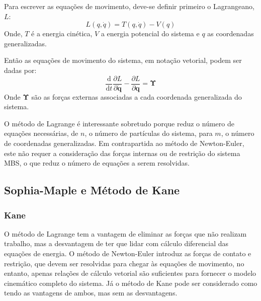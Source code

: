 Para escrever as equações de movimento, deve-se definir primeiro o
Lagrangeano, $L$:
%
\begin{equation}
	L(q, \dot{q}) = T(q, \dot{q}) - V(q)
\end{equation}
%
Onde, $T$ é a energia cinética, $V$ a energia potencial do sistema e
$q$ as coordenadas generalizadas.

Então as equações de movimento do sistema, em notação vetorial, podem ser dadas
por:
%
\begin{equation}
	\frac{\mathrm{d} }{\mathrm{d} t}\frac{\partial L}{\partial \mathbf{\dot{q}}} -
	\frac{\partial L}{\partial \mathbf{q}} = \boldsymbol{\Upsilon}
\end{equation}
%
Onde $\boldsymbol{\Upsilon}$ são as forças externas associadas a cada
coordenada generalizada do sistema.

O método de Lagrange é interessante sobretudo porque reduz o número de equações
necessárias, de $n$, o número de partículas do sistema, para $m$, o número de
coordenadas generalizadas. Em contrapartida ao método de Newton-Euler, este
não requer a consideração das forças internas ou de restrição do sistema MBS, o
que reduz o número de equações a serem resolvidas.




\subsection{Sophia-Maple e Método de Kane}\label{sec::sophia_kane}

\subsubsection{Kane}

O método de Lagrange tem a vantagem de eliminar as forças que não realizam
trabalho, mas a desvantagem de ter que lidar com cálculo diferencial das
equações de energia. O método de Newton-Euler introduz as forças de contato e
restrição, que devem ser resolvidas para chegar às equações de movimento, no
entanto, apenas relações de cálculo vetorial são suficientes para fornecer o
modelo cinemático completo do sistema. Já o método de Kane pode ser
considerado como tendo as vantagens de ambos, mas sem as desvantagens.

